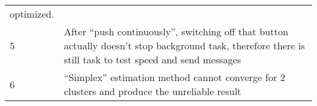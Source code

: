 \begin{longtable}[]{@{}ll@{}}
\begin{minipage}[t]{0.8\columnwidth}
optimized.\strut
\end{minipage}\tabularnewline
\begin{minipage}[t]{0.1\columnwidth}\raggedright
5\strut
\end{minipage} & \begin{minipage}[t]{0.8\columnwidth}\raggedright
After ``push continuously'', switching off that button actually doesn't
stop background task, therefore there is still task to test speed and
send messages\strut
\end{minipage}\tabularnewline
\begin{minipage}[t]{0.1\columnwidth}\raggedright
6\strut
\end{minipage} & \begin{minipage}[t]{0.8\columnwidth}\raggedright
``Simplex'' estimation method cannot converge for 2 clusters and produce
the unreliable result\strut
\end{minipage}\tabularnewline
\bottomrule
\end{longtable}

\newpage